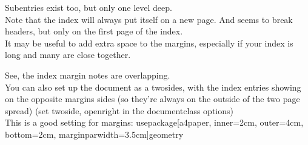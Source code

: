 \documentclass[11pt]{article}
\begin{document}
Subentries exist too, but only one level deep. \\ 


Note that the index will always put itself on a new page. And seems to break headers, but only on the first page of the index. \\


It may be useful to add extra space to the margins, especially if your index is long and many are close together. 

See, the index margin notes are overlapping. \\


You can also set up the document as a twosides, with the index entries showing on the opposite margins sides (so they're always on the outside of the two page spread) (set twoside, openright in the documentclass options) \\

This is a good setting for margins: usepackage[a4paper, inner=2cm, outer=4cm, bottom=2cm, marginparwidth=3.5cm]{geometry}

\printindex

\appendix

\end{document}
